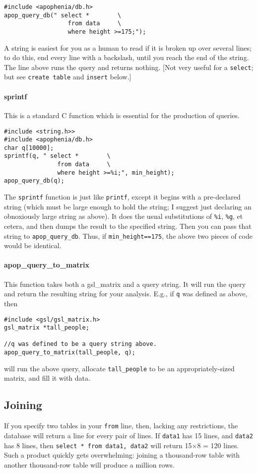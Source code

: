 \begin{verbatim}
#include <apophenia/db.h>
apop_query_db(" select *        \
                  from data     \
                  where height >=175;");
\end{verbatim}
A string is easiest for you as a human to read if it is
broken up over several lines; to do this, end every line with a
backslash, until you reach the end of the string. The line above runs
the query and returns nothing. [Not very useful for a {\tt select}; but see
{\tt create table} and  {\tt insert} below.]

\paragraph{sprintf} This is a standard C function which is essential for
the production of queries. 
\begin{verbatim}
#include <string.h>>
#include <apophenia/db.h>
char q[10000];
sprintf(q, " select *        \
               from data     \
               where height >=%i;", min_height);
apop_query_db(q);
\end{verbatim}
The {\tt sprintf} function is just like {\tt printf}, except it begins
with a pre-declared string (which must be large enough to hold the
string; I suggest just declaring an obnoxiously large string as above).
It does the usual substitutions of {\tt \%i}, {\tt \%g}, et cetera, and
then dumps the result to the specified string. Then you can pass that
string to {\tt apop_query_db}. Thus, if {\tt min_height==175}, the above
two pieces of code would be identical.

\paragraph{apop\_query\_to\_matrix} This function takes both a
gsl\_matrix and a query string. It will run the query and return the
resulting string for your analysis. E.g., if {\tt q} was defined as
above, then 
\begin{verbatim}
#include <gsl/gsl_matrix.h>
gsl_matrix *tall_people;

//q was defined to be a query string above.
apop_query_to_matrix(tall_people, q);
\end{verbatim}
will run the above query, allocate {\tt tall_people} to be an
appropriately-sized matrix, and fill it with data.

\subsection{Joining}
If you specify two tables in your {\tt from} line, then, lacking any
restrictions, the database will return a line for every pair of lines.
If {\tt data1} has 15 lines, and {\tt data2} has 8 lines, then {\tt select *
from data1, data2} will return 15$\times$8 = 120 lines.  Such a product
quickly gets overwhelming: joining a thousand-row table with another
thousand-row table will produce a million rows.

